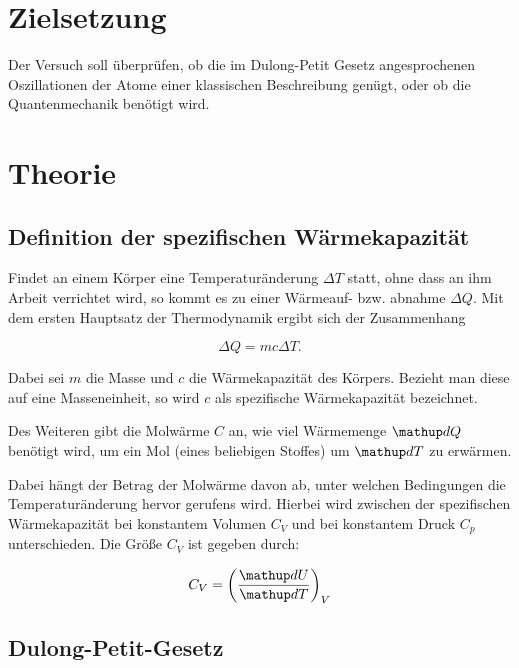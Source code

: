 \section*{Zielsetzung}
Der Versuch soll überprüfen, ob die im Dulong-Petit Gesetz %
angesprochenen Oszillationen der Atome einer klassischen Beschreibung genügt, %
oder ob die Quantenmechanik benötigt wird. %


\section{Theorie}

\subsection{Definition der spezifischen Wärmekapazität}

Findet an einem Körper eine Temperaturänderung $\Delta T$ statt, ohne dass an ihm  %
Arbeit verrichtet wird, so kommt es zu einer Wärmeauf- bzw. abnahme $\Delta Q$. %
Mit dem ersten Hauptsatz der Thermodynamik ergibt sich der Zusammenhang %

\begin{equation*}
\Delta Q=m c \Delta T.
\end{equation*}

Dabei sei $m$ die Masse und $c$ die Wärmekapazität
des Körpers.
Bezieht man diese auf eine Masseneinheit,
so wird $c$ als spezifische Wärmekapazität bezeichnet.

Des Weiteren gibt die Molwärme $C$
an, wie viel Wärmemenge $\map{d}Q$ benötigt wird, %
um ein Mol (eines beliebigen Stoffes) um $\map{d}T$ zu erwärmen.

Dabei hängt der Betrag der Molwärme davon ab, unter welchen Bedingungen
die Temperaturänderung hervor gerufens wird.
Hierbei wird zwischen der spezifischen Wärmekapazität bei konstantem
Volumen $C_{V}$ und bei konstantem Druck $C_{p}$ unterschieden.
Die Größe $C_{V}$ ist gegeben durch: %

\begin{equation}
\label{eq:molwarme}
C_V=\left(\frac{\map{d}U}{\map{d}T}\right)_V
\end{equation}


\subsection{Dulong-Petit-Gesetz}

